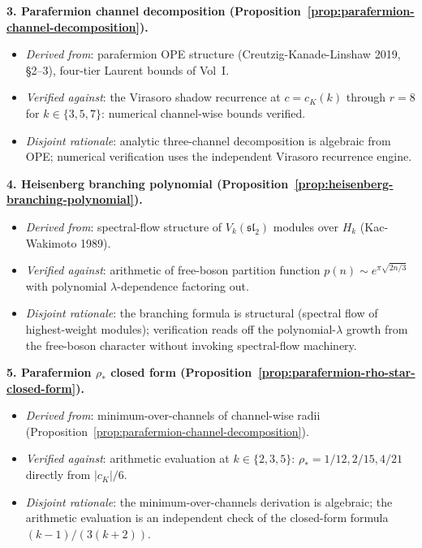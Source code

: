 \textbf{3. Parafermion channel decomposition
(Proposition~\ref{prop:parafermion-channel-decomposition}).}
\begin{itemize}[nosep]
\item \emph{Derived from}: parafermion OPE structure
 (Creutzig-Kanade-Linshaw 2019, \S 2--3), four-tier Laurent bounds
 of Vol~I.
\item \emph{Verified against}: the Virasoro shadow recurrence
 at $c = c_K(k)$ through $r = 8$ for $k \in \{3, 5, 7\}$: numerical
 channel-wise bounds verified.
\item \emph{Disjoint rationale}: analytic three-channel decomposition
 is algebraic from OPE; numerical verification uses the independent
 Virasoro recurrence engine.
\end{itemize}

\textbf{4. Heisenberg branching polynomial
(Proposition~\ref{prop:heisenberg-branching-polynomial}).}
\begin{itemize}[nosep]
\item \emph{Derived from}: spectral-flow structure of
 $V_k(\mathfrak{sl}_2)$ modules over $H_k$ (Kac-Wakimoto 1989).
\item \emph{Verified against}: arithmetic of free-boson partition
 function $p(n) \sim e^{\pi \sqrt{2 n / 3}}$ with polynomial
 $\lambda$-dependence factoring out.
\item \emph{Disjoint rationale}: the branching formula is structural
 (spectral flow of highest-weight modules); verification reads off
 the polynomial-$\lambda$ growth from the free-boson character
 without invoking spectral-flow machinery.
\end{itemize}

\textbf{5. Parafermion $\rho_*$ closed form
(Proposition~\ref{prop:parafermion-rho-star-closed-form}).}
\begin{itemize}[nosep]
\item \emph{Derived from}: minimum-over-channels of channel-wise radii
 (Proposition~\ref{prop:parafermion-channel-decomposition}).
\item \emph{Verified against}: arithmetic evaluation at $k \in
 \{2, 3, 5\}$: $\rho_* = 1/12, 2/15, 4/21$ directly from
 $|c_K|/6$.
\item \emph{Disjoint rationale}: the minimum-over-channels
 derivation is algebraic; the arithmetic evaluation is an
 independent check of the closed-form formula
 $(k - 1)/(3(k + 2))$.
\end{itemize}

